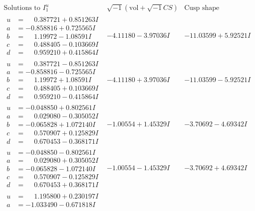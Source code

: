 \documentclass[1p]{elsarticle_modified}
\theoremstyle{definition}
\newcommand{\I}{\sqrt{-1}}
\begin{document}
$$\begin{array}{c|c|c}  
\text{Solutions to }I^u_{1}& \I (\text{vol} + \sqrt{-1}CS) & \text{Cusp shape}\\
 \hline 
\begin{aligned}
u &= \phantom{-}0.387721 + 0.851263 I \\
a &= -0.858816 + 0.725565 I \\
b &= \phantom{-}1.19972 - 1.08591 I \\
c &= \phantom{-}0.488405 - 0.103669 I \\
d &= \phantom{-}0.959210 + 0.415864 I\end{aligned}
 & -4.11180 - 3.97036 I & -11.03599 + 5.92521 I \\ \hline\begin{aligned}
u &= \phantom{-}0.387721 - 0.851263 I \\
a &= -0.858816 - 0.725565 I \\
b &= \phantom{-}1.19972 + 1.08591 I \\
c &= \phantom{-}0.488405 + 0.103669 I \\
d &= \phantom{-}0.959210 - 0.415864 I\end{aligned}
 & -4.11180 + 3.97036 I & -11.03599 - 5.92521 I \\ \hline\begin{aligned}
u &= -0.048850 + 0.802561 I \\
a &= \phantom{-}0.029080 - 0.305052 I \\
b &= -0.065828 + 1.072140 I \\
c &= \phantom{-}0.570907 + 0.125829 I \\
d &= \phantom{-}0.670453 - 0.368171 I\end{aligned}
 & -1.00554 + 1.45329 I & -3.70692 - 4.69342 I \\ \hline\begin{aligned}
u &= -0.048850 - 0.802561 I \\
a &= \phantom{-}0.029080 + 0.305052 I \\
b &= -0.065828 - 1.072140 I \\
c &= \phantom{-}0.570907 - 0.125829 I \\
d &= \phantom{-}0.670453 + 0.368171 I\end{aligned}
 & -1.00554 - 1.45329 I & -3.70692 + 4.69342 I \\ \hline\begin{aligned}
u &= \phantom{-}1.195800 + 0.230197 I \\
a &= -1.033490 - 0.671818 I \\

\end{aligned}
\end{array}$$
\end{document}

